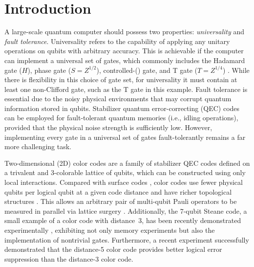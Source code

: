 \documentclass[
 prx,
 reprint,
 superscriptaddress,
 longbibliography,
 dvipsnames
]{revtex4-2}
\begin{document}
\maketitle

\section{Introduction \label{sec:introduction}}

A large-scale quantum computer should possess two properties: \textit{universality} and \textit{fault tolerance}. 
Universality refers to the capability of applying any unitary operations on qubits with arbitrary accuracy. 
This is achievable if the computer can implement a universal set of gates, which commonly includes the Hadamard gate ($H$), phase gate ($S = Z^{1/2}$), controlled-\nnot (\cnot) gate, and T gate ($T = Z^{1/4}$) \cite{nielsen2010quantum}. 
While there is flexibility in this choice of gate set, for universality it must contain at least one non-Clifford gate, such as the T gate in this example. 
Fault tolerance is essential due to the noisy physical environments that may corrupt quantum information stored in qubits. 
Stabilizer quantum error-correcting (QEC) codes can be employed for fault-tolerant quantum memories (i.e., idling operations), provided that the physical noise strength is sufficiently low. 
However, implementing every gate in a universal set of gates fault-tolerantly remains a far more challenging task.

Two-dimensional (2D) color codes \cite{bombin2006topological,bombin2013topological} are a family of stabilizer QEC codes defined on a trivalent and 3-colorable lattice of qubits, which can be constructed using only local interactions. 
Compared with surface codes \cite{bravyi1998quantum,dennis2002topological}, color codes use fewer physical qubits per logical qubit at a given code distance \cite{landahl2011faulttolerant} and have richer topological structures \cite{kesselring2022anyon}. 
This allows an arbitrary pair of multi-qubit Pauli operators to be measured in parallel via lattice surgery \cite{thomsen2024low}. 
Additionally, the 7-qubit Steane code, a small example of a color code with distance~3, has been recently demonstrated experimentally \cite{postler2022demonstration,ryananderson2022implementing,bluvstein2024logical,postler2024demonstration}, exhibiting not only memory experiments but also the implementation of nontrivial gates.
Furthermore, a recent experiment \cite{lacroix2024scaling} successfully demonstrated that the distance-5 color code provides better logical error suppression than the distance-3 color code.
\end{document}

